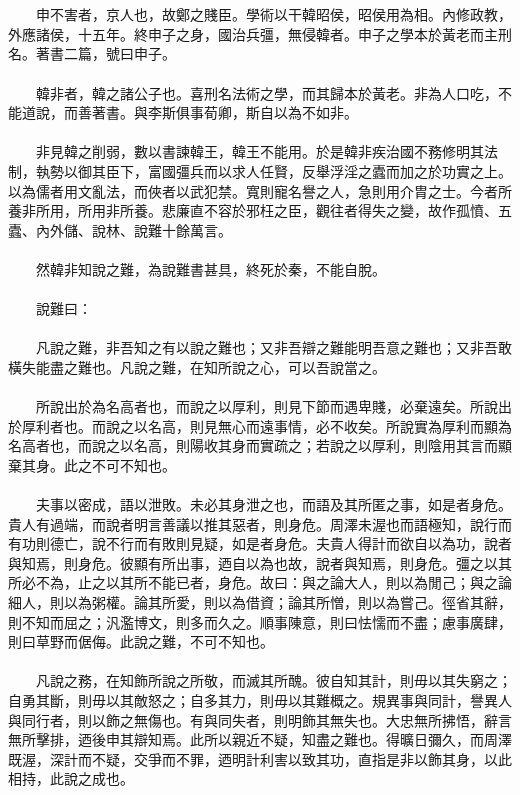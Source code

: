 \\\\
　　申不害者，京人也，故鄭之賤臣。學術以干韓昭侯，昭侯用為相。內修政教，外應諸侯，十五年。終申子之身，國治兵彊，無侵韓者。申子之學本於黃老而主刑名。著書二篇，號曰申子。
\\\\
　　韓非者，韓之諸公子也。喜刑名法術之學，而其歸本於黃老。非為人口吃，不能道說，而善著書。與李斯俱事荀卿，斯自以為不如非。
\\\\
　　非見韓之削弱，數以書諫韓王，韓王不能用。於是韓非疾治國不務修明其法制，執勢以御其臣下，富國彊兵而以求人任賢，反舉浮淫之蠹而加之於功實之上。以為儒者用文亂法，而俠者以武犯禁。寬則寵名譽之人，急則用介胄之士。今者所養非所用，所用非所養。悲廉直不容於邪枉之臣，觀往者得失之變，故作孤憤、五蠹、內外儲、說林、說難十餘萬言。
\\\\
　　然韓非知說之難，為說難書甚具，終死於秦，不能自脫。
\\\\
　　說難曰：
\\\\
　　凡說之難，非吾知之有以說之難也；又非吾辯之難能明吾意之難也；又非吾敢橫失能盡之難也。凡說之難，在知所說之心，可以吾說當之。
\\\\
　　所說出於為名高者也，而說之以厚利，則見下節而遇卑賤，必棄遠矣。所說出於厚利者也。而說之以名高，則見無心而遠事情，必不收矣。所說實為厚利而顯為名高者也，而說之以名高，則陽收其身而實疏之；若說之以厚利，則陰用其言而顯棄其身。此之不可不知也。
\\\\
　　夫事以密成，語以泄敗。未必其身泄之也，而語及其所匿之事，如是者身危。貴人有過端，而說者明言善議以推其惡者，則身危。周澤未渥也而語極知，說行而有功則德亡，說不行而有敗則見疑，如是者身危。夫貴人得計而欲自以為功，說者與知焉，則身危。彼顯有所出事，迺自以為也故，說者與知焉，則身危。彊之以其所必不為，止之以其所不能已者，身危。故曰：與之論大人，則以為閒己；與之論細人，則以為粥權。論其所愛，則以為借資；論其所憎，則以為嘗己。徑省其辭，則不知而屈之；汎濫博文，則多而久之。順事陳意，則曰怯懦而不盡；慮事廣肆，則曰草野而倨侮。此說之難，不可不知也。
\\\\
　　凡說之務，在知飾所說之所敬，而滅其所醜。彼自知其計，則毋以其失窮之；自勇其斷，則毋以其敵怒之；自多其力，則毋以其難概之。規異事與同計，譽異人與同行者，則以飾之無傷也。有與同失者，則明飾其無失也。大忠無所拂悟，辭言無所擊排，迺後申其辯知焉。此所以親近不疑，知盡之難也。得曠日彌久，而周澤既渥，深計而不疑，交爭而不罪，迺明計利害以致其功，直指是非以飾其身，以此相持，此說之成也。
